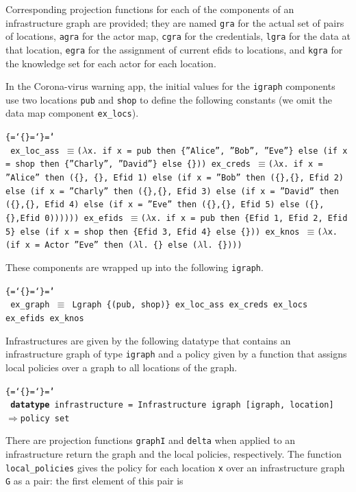 \documentclass{llncs}
\newenvironment{ttbox}{\begin{alltt}\ttbraces\small\tt}%
                      {\end{alltt}}
\def\ttbraces{\let\.=\nobreak\chardef\{=`\{\chardef\}=`\}\chardef\|=`\\}
\newcommand\ttfun{\mbox{{$\Rightarrow$}}}
\newcommand\ttequiv{\mbox{{$\equiv$}}}
\newcommand\ttlam{\mbox{\( \lambda \)}}
\begin{document}
Corresponding projection functions for each of the components of an 
infrastructure graph are provided; they are named \texttt{gra} for the actual 
set of pairs of locations, \texttt{agra} for the actor map, \texttt{cgra} for 
the credentials, \texttt{lgra} for the %
data at that location, \texttt{egra} for the assignment of current efids to locations,
and \texttt{kgra} for the knowledge set for each actor for each location.

In the Corona-virus warning app, the initial values for the \texttt{igraph} components use
two locations \texttt{pub} and \texttt{shop} to define the following constants (we omit the
data map component \texttt{ex\_locs}).
\begin{ttbox}
ex_loc_ass \ttequiv (\ttlam x. if x = pub then \{''Alice'', ''Bob'', ''Eve''\}  
                 else (if x = shop then \{''Charly'', ''David''\} 
                 else \{\}))
ex_creds \ttequiv (\ttlam x. if x = ''Alice'' then (\{\}, \{\}, Efid 1) else 
              (if x = ''Bob'' then  (\{\},\{\}, Efid 2) else 
              (if x = ''Charly'' then (\{\},\{\}, Efid 3) else
              (if x = ''David'' then (\{\},\{\}, Efid 4) else
              (if x = ''Eve'' then (\{\},\{\}, Efid 5)
               else (\{\},\{\},Efid 0))))))
ex_efids \ttequiv (\ttlam x. if x = pub then \{Efid 1, Efid 2, Efid 5\}
                  else (if x = shop then \{Efid 3, Efid 4\} else \{\}))
ex_knos \ttequiv (\ttlam x. (if x = Actor ''Eve'' then (\ttlam l. \{\} else (\ttlam l. \{\})))
\end{ttbox}  
These components are wrapped up into the following \texttt{igraph}.
\begin{ttbox}
ex_graph \ttequiv
      Lgraph \{(pub, shop)\} ex_loc_ass ex_creds ex_locs ex_efids ex_knos
\end{ttbox}  
Infrastructures are given by the following datatype that 
contains an infrastructure graph of type \texttt{igraph} 
and a policy given by a function that assigns local policies over a graph to
all locations of the graph. 
\begin{ttbox}
{\bf{datatype}} infrastructure = Infrastructure igraph 
                                         [igraph, location] \ttfun policy set
\end{ttbox}
There are projection functions \texttt{graphI} and \texttt{delta} when applied
to an infrastructure return the graph and the local policies, respectively.
The function \texttt{local\_policies} gives the policy for each location \texttt{x}
over an infrastructure graph \texttt{G} as a pair: the first element of this pair is 
\end{document}
